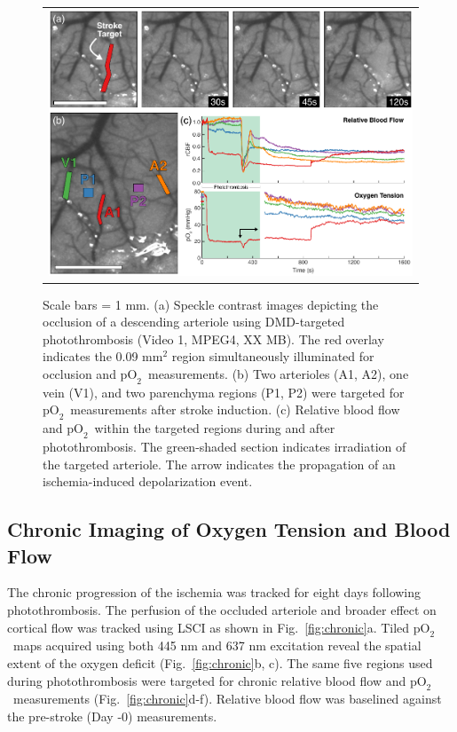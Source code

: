 \documentclass[12pt]{spieman}  %
\newcommand{\pO}{\ensuremath{\text{pO}_2}} 	            %
\begin{document}
\begin{spacing}{2}
\begin{figure}
    \begin{center}
        \begin{tabular}{c}
            \includegraphics[width=6.25in]{Figure5.pdf}
        \end{tabular}
    \end{center}
    \caption {
        \label{fig:photothrombosis}
        Scale bars = 1 mm. (a) Speckle contrast images depicting the occlusion of a descending arteriole using DMD-targeted photothrombosis (Video 1, MPEG4, XX MB). The red overlay indicates the 0.09 mm$^{2}$ region simultaneously illuminated for occlusion and \pO\ measurements. (b) Two arterioles (A1, A2), one vein (V1), and two parenchyma regions (P1, P2) were targeted for \pO\ measurements after stroke induction. (c) Relative blood flow and \pO\ within the targeted regions during and after photothrombosis. The green-shaded section indicates irradiation of the targeted arteriole. The arrow indicates the propagation of an ischemia-induced depolarization event.
    }
\end{figure}


\subsection{Chronic Imaging of Oxygen Tension and Blood Flow}

The chronic progression of the ischemia was tracked for eight days following photothrombosis. The perfusion of the occluded arteriole and broader effect on cortical flow was tracked using LSCI as shown in Fig.~\ref{fig:chronic}a. Tiled \pO\ maps acquired using both 445 nm and 637 nm excitation reveal the spatial extent of the oxygen deficit (Fig.~\ref{fig:chronic}b, c). The same five regions used during photothrombosis were targeted for chronic relative blood flow and \pO\ measurements (Fig.~\ref{fig:chronic}d-f). Relative blood flow was baselined against the pre-stroke (Day -0) measurements.


\end{spacing}
\end{document}
